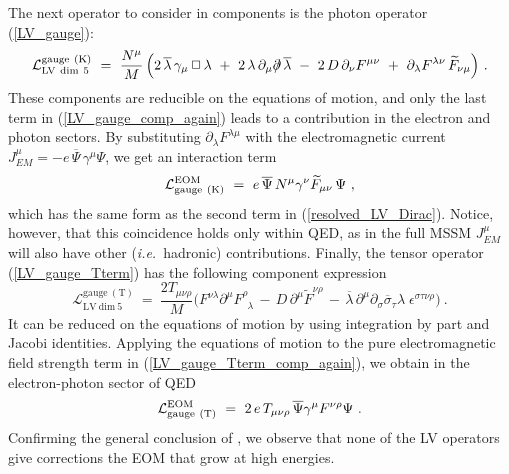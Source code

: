 \documentclass[12pt]{revtex4}
\newcommand{\slashed}[1]{\hbox{{$#1$}\llap{$/$}}}
\begin{document}
%
The next operator to consider in components is the photon operator
(\ref{LV_gauge}):
\begin{equation}
\label{LV_gauge_comp_again}
\mathcal{L}_{\mathrm{LV~dim~5}}^{\mathrm{gauge\ (K)}} 
 ~=~ \frac{N^\mu}{M}\,  
\Big( 
2\, \overline{\lambda}\,\gamma_\mu\, \Box\, 
   \lambda 
~+~
2\, \lambda\, \partial_\mu \slashed{\partial}\, 
   \overline{\lambda} 
~-~ 
2\, D\, \partial_\nu F^{\mu\nu}
~+~ 
\partial_\lambda F^{\lambda\nu}\, 
\widetilde{F}_{\nu\mu} 
\Big)~.
\end{equation}
%
These components are reducible on the equations of motion, 
and only the last term in (\ref{LV_gauge_comp_again})
leads to a contribution in the electron and photon sectors. 
By substituting $ \partial_\lambda F^{\lambda\mu} $ 
with the electromagnetic current 
$ J_{EM}^\mu=- e\, \overline{\Psi}\, \gamma^\mu \Psi $,
we get an interaction term
\begin{equation}
\label{LV_induced_by_gauge_K}
        \mathcal{L}_{\rm gauge\ (K)}^{\rm EOM} ~=~  
 e\, \overline{\Psi}\, N^\mu \gamma^\nu
\widetilde{F}_{\mu\nu}\, \Psi~,
\end{equation}
%
which  has the same form as the second term in (\ref{resolved_LV_Dirac}).
Notice, however, that this coincidence holds only within QED, 
as in the full MSSM $J_{EM}^\mu$ will also have other 
({\em i.e.}\ hadronic) contributions. Finally, the tensor operator
(\ref{LV_gauge_Tterm}) has the following component expression 
\begin{equation}
\mathcal{L}_{\mathrm{LV~dim~5}}^{\mathrm{gauge\ (T)}}  
      ~  =~ 
\frac{2T_{\mu\nu\rho}}{M}
\Big( 
F^{\nu\lambda}\partial^\mu F^\rho_{\phantom{\rho}\lambda}
\,-\, D\, \partial^\mu \widetilde{F}^{\nu\rho} 
\,-\,\overline{\lambda}\, \partial^\mu \partial_\sigma
\overline{\sigma}_\tau \lambda\; \epsilon^{\sigma\tau\nu\rho}
\Big)~.
\label{LV_gauge_Tterm_comp_again}
\end{equation}
It can be reduced on the equations of motion by using integration by
part and Jacobi identities.     
Applying the equations of motion to the pure
electromagnetic field strength term in 
(\ref{LV_gauge_Tterm_comp_again}), we obtain in the
electron-photon sector of QED
\begin{eqnarray}
        \mathcal{L}_{\rm gauge\ (T)}^{\rm EOM} ~=~   
\label{LV_induced_by_gauge_T}
        2\,e\,  T_{\mu\nu\rho} \, 
         \overline{\Psi} \gamma^\mu F^{\nu\rho} \Psi
        ~.
\end{eqnarray}
%
Confirming the general conclusion of \cite{GrootNibbelink:2004za}, we
observe that none of the LV operators give corrections the EOM that
grow at high energies.  
\end{document}
